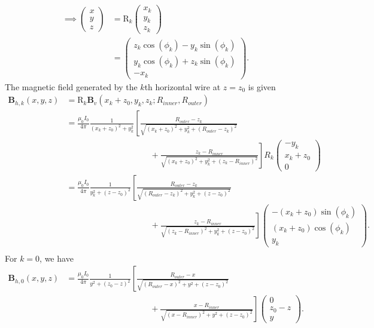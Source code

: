 \documentclass{article}
\let\vec\mathbf
\begin{document}
\[\begin{aligned}
\implies
\begin{pmatrix}
    x \\ y \\ z
\end{pmatrix} &= 
\text{R}_k
\begin{pmatrix}
    x_k \\ y_k \\ z_k
\end{pmatrix} \\
&= \begin{pmatrix}
    z_k\cos(\phi_k)-y_k\sin(\phi_k)  \\
    y_k\cos(\phi_k) +z_k\sin(\phi_k) \\
    -x_k
\end{pmatrix}.
\end{aligned}\]
The magnetic field generated by the $k$th horizontal wire at $z=z_0$ is given
\[\begin{aligned}
    \vec{B}_{h,k}(x, y, z) &= \text{R}_k\mathbf{B}_{v}(x_k + z_0, y_k, z_k; R_{inner}, R_{outer}) \\
    &= \frac{\mu_0 I_0}{4\pi}\frac{1}{(x_k+z_0)^2+y_k^2}\left[\frac{R_{outer}-z_k}{\sqrt{(x_k+z_0)^2+y_k^2+(R_{outer}-z_k)^2}}\right. \\
     &\qquad\qquad\qquad\qquad\qquad+\left.\frac{z_k-R_{inner}}{\sqrt{(x_k+z_0)^2+y_k^2+(z_k-R_{inner})^2}}\right]
    R_k\begin{pmatrix}
        -y_k \\
        x_k+z_0 \\
        0
    \end{pmatrix}\\
    &= \frac{\mu_0 I_0}{4\pi}\frac{1}{y_k^2+(z-z_0)^2}\left[\frac{R_{outer}-z_k}{\sqrt{(R_{outer}-z_k)^2+y_k^2+(z-z_0)^2}}\right. \\
     &\qquad\qquad\qquad\qquad\qquad+\left.\frac{z_k-R_{inner}}{\sqrt{(z_k-R_{inner})^2+y_k^2+(z-z_0)^2}}\right]
    \begin{pmatrix}
        -(x_k+z_0)\sin(\phi_k) \\
        (x_k+z_0)\cos(\phi_k) \\
        y_k
    \end{pmatrix}. \\
\end{aligned}\]
For $k=0$, we have
\[\begin{aligned}
    \vec{B}_{h,0}(x, y, z) &= \frac{\mu_0 I_0}{4\pi}\frac{1}{y^2+(z_0-z)^2}\left[\frac{R_{outer}-x}{\sqrt{(R_{outer}-x)^2+y^2+(z-z_0)^2}}\right. \\
    &\qquad\qquad\qquad\qquad\qquad+\left.\frac{x-R_{inner}}{\sqrt{(x-R_{inner})^2+y^2+(z-z_0)^2}}\right]
   \begin{pmatrix}
       0 \\
       z_0-z \\
       y
    \end{pmatrix}. \\
\end{aligned}\]
\end{document}
